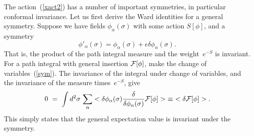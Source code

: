 
The action~(\ref{xact2}) has a number of important symmetries,
in particular conformal invariance.  Let us first derive the
Ward identities for a general symmetry.  Suppose we have fields
$\phi_\alpha(\sigma)$ with some action $S[\phi]$, and a symmetry
\begin{equation}
\phi'_\alpha(\sigma)
= \phi_\alpha(\sigma) + \epsilon\delta\phi_\alpha(\sigma).
\label{sym}
\end{equation}
That is, the product of the path integral measure and the
weight~$e^{-S}$ is invariant.  For a path integral with general
insertion ${\cal F}[\phi]$, make the change of
variables~(\ref{sym}).
The invariance of the integral under change of variables, and the
invariance of the measure times~$e^{-S}$, give
\begin{equation}
0\ =\ \int d^2\sigma\,\sum_\alpha < \delta\phi_\alpha(\sigma)
\frac{\delta}{\delta \phi_\alpha(\sigma)} {\cal F}[\phi] >
\ \equiv\ < \delta {\cal F}[\phi] >.
\end{equation}
This simply states that the general expectation value is invariant
under the symmetry.

